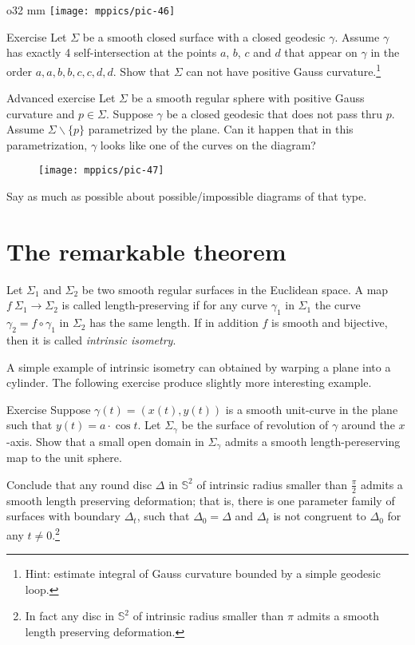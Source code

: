 {

\begin{wrapfigure}{o}{32 mm}
\vskip-0mm
\centering
\texttt{[image: mppics/pic-46]}
\vskip-0mm
\end{wrapfigure}

\begin{thm}{Exercise}
Let $\Sigma$ be a smooth closed surface with a closed geodesic $\gamma$.
Assume $\gamma$ has exactly 4 self-intersection at the points $a$, $b$, $c$ and $d$ that appear on $\gamma$ in the order $a,a,b,b,c,c,d,d$.
Show that $\Sigma$ can not have positive Gauss curvature.\footnote{Hint: estimate integral of Gauss curvature bounded by a simple geodesic loop.}
\end{thm}

\begin{thm}{Advanced exercise}
Let $\Sigma$ be a smooth regular sphere with positive Gauss curvature and $p\in\Sigma$. 
Suppose $\gamma$ be a closed geodesic that does not pass thru $p$.
Assume $\Sigma\backslash\{p\}$ parametrized by the plane.
Can it happen that in this parametrization,  $\gamma$ looks like one of the curves on the diagram?
\begin{figure}[h!]
\vskip-0mm
\centering
\texttt{[image: mppics/pic-47]}
\vskip-0mm
\end{figure}
Say as much as possible about possible/impossible diagrams of that type.
\end{thm}

}

\section{The remarkable theorem}

Let $\Sigma_1$ and $\Sigma_2$ be two smooth regular surfaces in the Euclidean space.
A map $f\:\Sigma_1\to \Sigma_2$ is called  length-preserving if for any curve $\gamma_1$ in $\Sigma_1$ the curve $\gamma_2=f\circ\gamma_1$ in $\Sigma_2$ has the same length. %
If in addition $f$ is smooth and bijective, then it is called \emph{intrinsic isometry}. 

A simple example of intrinsic isometry can obtained by warping a plane into a cylinder.
The following exercise produce slightly more interesting example.

\begin{thm}{Exercise}
Suppose $\gamma(t)=(x(t),y(t))$ is a smooth unit-curve in the plane such that $y(t)=a\cdot \cos t$.
Let $\Sigma_\gamma$ be the surface of revolution of $\gamma$ around the $x$-axis.
Show that a small open domain in $\Sigma_\gamma$ admits a smooth length-pereserving map to the unit sphere.

Conclude that any round disc $\Delta$ in $\mathbb{S}^2$ of intrinsic radius smaller than $\tfrac\pi2$ admits a smooth length preserving deformation; that is, there is one parameter family of surfaces with boundary $\Delta_t$, such that $\Delta_0=\Delta$ and $\Delta_t$ is not congruent to $\Delta_0$ for any $t\ne0$.\footnote{In fact any disc in $\mathbb{S}^2$ of intrinsic radius smaller than $\pi$ admits a smooth length preserving deformation. %
}
\end{thm}


